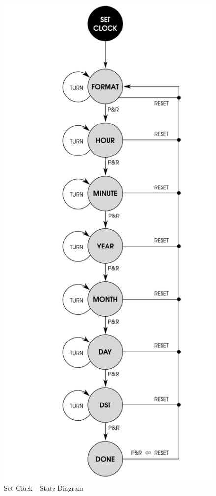 \begin{figure}[H]
\centering
  \includegraphics{images/set_clock_state_diagram.png}
\caption{Set Clock - State Diagram} 
\end{figure}
